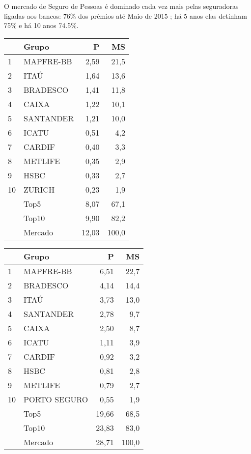 \documentclass[../../relatorio.tex]{subfiles}
\begin{document}
O mercado de Seguro de Pessoas é dominado cada vez mais pelas seguradoras ligadas aos bancos: 76\% dos prêmios até Maio de 2015 ; há 5 anos elas detinham 75\% e há 10 anos 74.5\%.

\begin{table}[!h]
  \begin{minipage}[t]{0.49\linewidth}
    \centering
\begin{tabular}{llrr}
  \hline
 & Grupo & P & MS \\ 
  \hline
1 & MAPFRE-BB & 2,59 & 21,5 \\ 
  2 & ITAÚ & 1,64 & 13,6 \\ 
  3 & BRADESCO & 1,41 & 11,8 \\ 
  4 & CAIXA & 1,22 & 10,1 \\ 
  5 & SANTANDER & 1,21 & 10,0 \\ 
  6 & ICATU & 0,51 & 4,2 \\ 
  7 & CARDIF & 0,40 & 3,3 \\ 
  8 & METLIFE & 0,35 & 2,9 \\ 
  9 & HSBC & 0,33 & 2,7 \\ 
  10 & ZURICH & 0,23 & 1,9 \\ 
   \hline
 & Top5 & 8,07 & 67,1 \\ 
   & Top10 & 9,90 & 82,2 \\ 
   & Mercado & 12,03 & 100,0 \\ 
   \hline
\end{tabular}    
  \end{minipage}
  \hspace{0.5cm}
  \begin{minipage}[t]{0.49\linewidth}
    \centering
\begin{tabular}{llrr}
  \hline
 & Grupo & P & MS \\ 
  \hline
1 & MAPFRE-BB & 6,51 & 22,7 \\ 
  2 & BRADESCO & 4,14 & 14,4 \\ 
  3 & ITAÚ & 3,73 & 13,0 \\ 
  4 & SANTANDER & 2,78 & 9,7 \\ 
  5 & CAIXA & 2,50 & 8,7 \\ 
  6 & ICATU & 1,11 & 3,9 \\ 
  7 & CARDIF & 0,92 & 3,2 \\ 
  8 & HSBC & 0,81 & 2,8 \\ 
  9 & METLIFE & 0,79 & 2,7 \\ 
  10 & PORTO SEGURO & 0,55 & 1,9 \\ 
   \hline
 & Top5 & 19,66 & 68,5 \\ 
   & Top10 & 23,83 & 83,0 \\ 
   & Mercado & 28,71 & 100,0 \\ 
   \hline
\end{tabular}    
  \end{minipage}
\end{table}

\pagebreak
\end{document}

